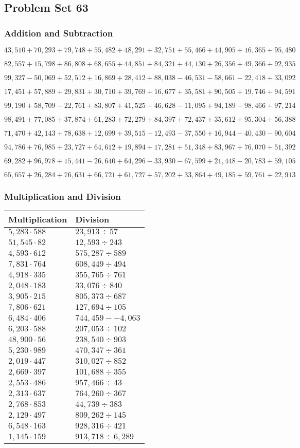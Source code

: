 \hypertarget{problem-set-63}{%
\subsection{Problem Set 63}\label{problem-set-63}}

\hypertarget{addition-and-subtraction-285}{%
\subsubsection{Addition and
Subtraction}\label{addition-and-subtraction-285}}

\(43,510+70,293+79,748+55,482+48,291+32,751+55,466+44,905+16,365+ 95,480\)

\(82,557+15,798+86,808+68,655+44,851+84,321+44,130+26,356+49,366+92,935\)

\(99,327-50,069+52,512+16,869+28,412+88,038-46,531-58,661-22,418+33,092\)

\(17,451+57,889+29,831+30,710+39,769+16,677+35,581+90,505+19,746+94,591\)

\(99,190+58,709-22,761+83,807+41,525-46,628-11,095+94,189-98,466+97,214\)

\(98,491+77,085+37,874+61,283+72,279+84,397+72,437+35,612+95,304+56,388\)

\(71,470+42,143+78,638+12,699+39,515-12,493-37,550+16,944-40,430-90,604\)

\(94,786+76,985+23,727+64,612+19,894+17,281+51,348+83,967+76,070+51,392\)

\(69,282+96,978+15,441-26,640+64,296-33,930-67,599+21,448-20,783+59,105\)

\(65,657+26,284+76,631+66,721+61,727+57,202+33,864+49,185+59,761+22,913\)

\hypertarget{multiplication-and-division-284}{%
\subsubsection{Multiplication and
Division}\label{multiplication-and-division-284}}

\begin{longtable}[]{@{}ll@{}}
\toprule
Multiplication & Division\tabularnewline
\midrule
\endhead
\(5,283\cdot588\) & \(23,913÷57\)\tabularnewline
\(51,545\cdot82\) & \(12,593÷243\)\tabularnewline
\(4,593\cdot612\) & \(575,287÷589\)\tabularnewline
\(7,831\cdot764\) & \(608,449÷494\)\tabularnewline
\(4,918\cdot335\) & \(355,765÷761\)\tabularnewline
\(2,048\cdot183\) & \(33,076÷840\)\tabularnewline
\(3,905\cdot215\) & \(805,373÷687\)\tabularnewline
\(7,806\cdot621\) & \(127,694÷105\)\tabularnewline
\(6,484\cdot406\) & \(744,459 -- 4,063\)\tabularnewline
\(6,203\cdot588\) & \(207,053÷102\)\tabularnewline
\(48,900\cdot56\) & \(238,540÷903\)\tabularnewline
\(5,230\cdot989\) & \(470,347÷361\)\tabularnewline
\(2,019\cdot447\) & \(310,027÷852\)\tabularnewline
\(2,669\cdot397\) & \(101,688÷355\)\tabularnewline
\(2,553\cdot486\) & \(957,466÷43\)\tabularnewline
\(2,313\cdot637\) & \(764,260÷367\)\tabularnewline
\(2,768\cdot853\) & \(44,739÷383\)\tabularnewline
\(2,129\cdot497\) & \(809,262÷145\)\tabularnewline
\(6,548\cdot163\) & \(928,316÷421\)\tabularnewline
\(1,145\cdot159\) & \(913,718÷6,289\)\tabularnewline
\bottomrule
\end{longtable}

